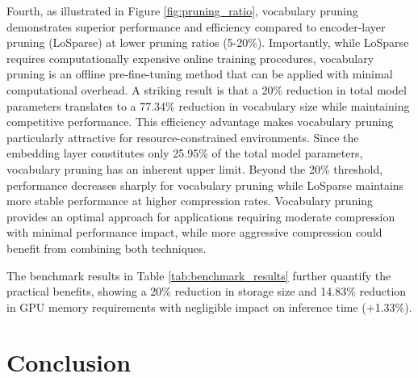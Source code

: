 \documentclass[twocolumn]{article}
\begin{document}
Fourth, as illustrated in Figure \ref{fig:pruning_ratio}, vocabulary pruning demonstrates superior performance and efficiency compared to encoder-layer pruning (LoSparse) at lower pruning ratios (5-20\%). Importantly, while LoSparse requires computationally expensive online training procedures, vocabulary pruning is an offline pre-fine-tuning method that can be applied with minimal computational overhead. A striking result is that a 20\% reduction in total model parameters translates to a 77.34\% reduction in vocabulary size while maintaining competitive performance. This efficiency advantage makes vocabulary pruning particularly attractive for resource-constrained environments. Since the embedding layer constitutes only 25.95\% of the total model parameters, vocabulary pruning has an inherent upper limit. Beyond the 20\% threshold, performance decreases sharply for vocabulary pruning while LoSparse maintains more stable performance at higher compression rates. Vocabulary pruning provides an optimal approach for applications requiring moderate compression with minimal performance impact, while more aggressive compression could benefit from combining both techniques.

The benchmark results in Table \ref{tab:benchmark_results} further quantify the practical benefits, showing a 20\% reduction in storage size and 14.83\% reduction in GPU memory requirements with negligible impact on inference time (+1.33\%).




\section{Conclusion}



    
\end{document}
